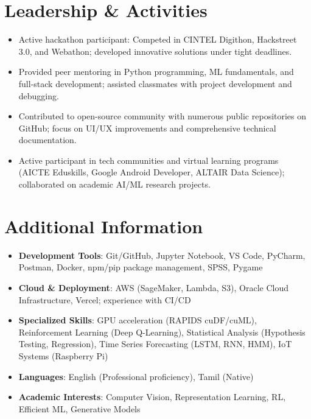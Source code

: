 \documentclass[10pt,a4paper]{article}
\newcommand{\sect}[1]{\vspace{6pt}\section*{#1}\vspace{-2pt}}
\begin{document}
\sect{Leadership \& Activities}

\begin{itemize}
  \item Active hackathon participant: Competed in CINTEL Digithon, Hackstreet 3.0, and Webathon; developed innovative solutions under tight deadlines.
  \item Provided peer mentoring in Python programming, ML fundamentals, and full-stack development; assisted classmates with project development and debugging.
  \item Contributed to open-source community with numerous public repositories on GitHub; focus on UI/UX improvements and comprehensive technical documentation.
  \item Active participant in tech communities and virtual learning programs (AICTE Eduskills, Google Android Developer, ALTAIR Data Science); collaborated on academic AI/ML research projects.
\end{itemize}

\sect{Additional Information}

\begin{itemize}
  \item \textbf{Development Tools}: Git/GitHub, Jupyter Notebook, VS Code, PyCharm, Postman, Docker, npm/pip package management, SPSS, Pygame
  \item \textbf{Cloud \& Deployment}: AWS (SageMaker, Lambda, S3), Oracle Cloud Infrastructure, Vercel; experience with CI/CD
  \item \textbf{Specialized Skills}: GPU acceleration (RAPIDS cuDF/cuML), Reinforcement Learning (Deep Q-Learning), Statistical Analysis (Hypothesis Testing, Regression), Time Series Forecasting (LSTM, RNN, HMM), IoT Systems (Raspberry Pi)
  \item \textbf{Languages}: English (Professional proficiency), Tamil (Native)
  \item \textbf{Academic Interests}: Computer Vision, Representation Learning, RL, Efficient ML, Generative Models
\end{itemize}
\end{document}
